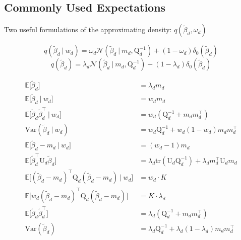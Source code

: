 \documentclass[twoside,11pt]{article}
\newcommand\given[1][]{\:#1\vert\:}
\newcommand{\transpose}[1]{#1^{\intercal}}
\newcommand{\E}{\mathbb{E}}
\newcommand{\betad}{\tilde{\beta}_d}
\newcommand{\umat}{\mathrm{U}}
\newcommand{\qmat}{\mathrm{Q}}
\newcommand{\qbeta}{\mathcal{N} \left( \betad \given m_d, \qmat_d^{-1} \right)}
\newcommand{\trace}[1]{\mathrm{tr} \left( #1 \right)}
\newcommand{\var}[1]{\mathrm{Var}\left(#1\right)}
\begin{document}
\begin{figure}
  \centering
\end{figure}





\newpage


\subsection{Commonly Used Expectations}

Two useful formulations of the approximating density: $q \left( \betad, \omega_d \right)$

\begin{equation} \label{eq:qbeta_omega}
	q(\betad \given w_d) = \omega_d \qbeta + (1 - \omega_d) \delta_0(\betad)
\end{equation}
\begin{equation}  \label{eq:qbeta_marginal}
	q(\betad) = \lambda_d \qbeta + (1 - \lambda_d) \delta_0(\betad)
\end{equation}

\begin{align*}
	\E \Big[ \betad \Big] &= \lambda_d m_d \\
	\E \Big[ \betad \given w_d \Big] &=  w_d m_d \\
	\E \Big[ \betad \transpose{\betad} \given w_d \Big] &= w_d \left( \qmat_d^{-1} + m_d \transpose{m_d} \right) \\
	\var{\betad \given w_d} &= w_d \qmat_d^{-1} + w_d(1-w_d) m_d \transpose{m_d} \\
	\E\Big[ \betad - m_d \given w_d \Big] &= (w_d - 1) m_d \\
	\E \Big[ \transpose{\betad} \umat_d \betad \Big] &= \lambda_d \trace{\umat_d \qmat_d^{-1}} + \lambda_d \transpose{m_d} \umat_d m_d \\
	\E \Big[ \transpose{(\betad - m_d)} \qmat_{d}(\betad - m_d) \given w_d \Big] &=  w_d \cdot K \\
	\E \Big[ w_d \transpose{(\betad - m_d)} \qmat_{d}(\betad - m_d) \Big] &= K \cdot \lambda_d \\
	\E \Big[ \betad \transpose{\betad} \Big] &=  \lambda_d \left( \qmat_d^{-1} + m_d \transpose{m_d} \right) \\
	\var{\betad} &= \lambda_d \qmat_d^{-1} + \lambda_d(1 - \lambda_d) m_d \transpose{m_d}
\end{align*}
\end{document}
